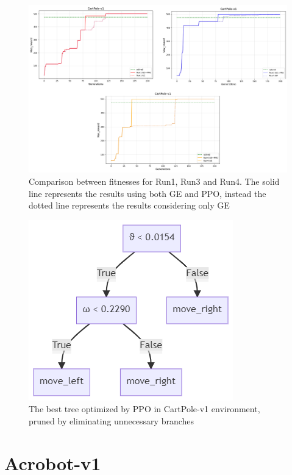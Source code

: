 \newpage

\begin{figure}[h!]
    \centering
    \includegraphics[width=1\linewidth]{images/CartPole/mixedRunSingle.png}
    \caption{Comparison between fitnesses for Run1, Run3 and Run4. The solid line represents the results using both GE and PPO, instead the dotted line represents the results considering only GE}
    \label{fig:ComparisonSingleCP}
\end{figure}

\begin{figure}[h!]
    \centering
    \includegraphics[width=0.4\linewidth]{images/CartPole/bestPPOprunedCP.png}
    \caption{The best tree optimized by PPO in CartPole-v1 environment, pruned by eliminating unnecessary branches}
    \label{fig:BestTreeCP}
\end{figure}

\newpage



\section{Acrobot-v1}
\label{sec:420}
